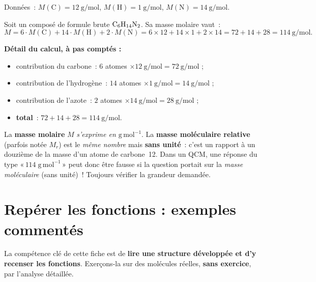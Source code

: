 \documentclass[11pt,a4paper]{article}
\begin{document}
\begin{exemple}
Données~: $M(\mathrm{C})=\qty{12}{\g\per\mole}$, $M(\mathrm{H})=\qty{1}{\g\per\mole}$, $M(\mathrm{N})=\qty{14}{\g\per\mole}$.

Soit un composé de formule brute $\ce{C6H14N2}$. Sa masse molaire vaut~:
\[
M = 6\cdot M(\mathrm{C}) + 14\cdot M(\mathrm{H}) + 2\cdot M(\mathrm{N})
   = 6\times12 + 14\times1 + 2\times14
   = 72 + 14 + 28 = \boxed{\qty{114}{\g\per\mole}}.
\]

\medskip
\textbf{Détail du calcul, à pas comptés :}
\begin{itemize}[leftmargin=1.6em,itemsep=1pt]
  \item contribution du carbone~: $6$ atomes $\times \qty{12}{\g\per\mole} = \qty{72}{\g\per\mole}$ ;
  \item contribution de l'hydrogène~: $14$ atomes $\times \qty{1}{\g\per\mole} = \qty{14}{\g\per\mole}$ ;
  \item contribution de l'azote~: $2$ atomes $\times \qty{14}{\g\per\mole} = \qty{28}{\g\per\mole}$ ;
  \item \textbf{total}~: $72 + 14 + 28 = \qty{114}{\g\per\mole}$.
\end{itemize}
\end{exemple}

\begin{attention}
La \textbf{masse molaire} $M$ \emph{s'exprime en $\mathrm{g\,mol^{-1}}$}. La \textbf{masse moléculaire relative} (parfois notée $M_r$) est le \emph{même nombre} mais \textbf{sans unité}~: c'est un rapport à un douzième de la masse d'un atome de carbone~12. Dans un QCM, une réponse du type «\,$114\;\mathrm{g\,mol^{-1}}$\,» peut donc être fausse si la question portait sur la \emph{masse moléculaire} (sans unité)~! Toujours vérifier la grandeur demandée.
\end{attention}

\section{Repérer les fonctions : exemples commentés}
La compétence clé de cette fiche est de \textbf{lire une structure développée et d'y recenser les fonctions}. Exerçons-la sur des molécules réelles, \textbf{sans exercice}, par l'analyse détaillée.
\end{document}
